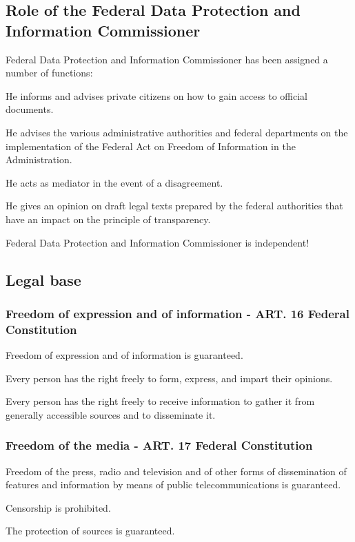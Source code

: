 \subsection{Role of the Federal Data Protection and	Information Commissioner}
Federal Data Protection and Information Commissioner has been assigned a number of functions:
\begin{compactitem}
	\item He informs and advises private citizens on how to gain access to official documents.
	\item He advises the various administrative authorities and federal departments on the implementation of the Federal Act on Freedom of Information in the Administration.
	\item He acts as mediator in the event of a disagreement.
	\item He gives an opinion on draft legal texts prepared by the federal authorities that have an impact on the principle of transparency.
\end{compactitem}
Federal Data Protection and Information Commissioner is independent!

\subsection{Legal base}
\subsubsection{Freedom of expression and of information - ART. 16 Federal Constitution}
\begin{compactenum}
	\item Freedom of expression and of information is guaranteed.
	\item Every person has the right freely to form, express, and impart their opinions.
	\item Every person has the right freely to receive information to gather it from generally accessible sources and to disseminate it.
\end{compactenum}	

\subsubsection{Freedom of the media - ART. 17 Federal Constitution}
\begin{compactenum}
	\item Freedom of the press, radio and television and of other forms of dissemination of features and information by means of public telecommunications is guaranteed.
	\item Censorship is prohibited.
	\item The protection of sources is guaranteed.
\end{compactenum}
